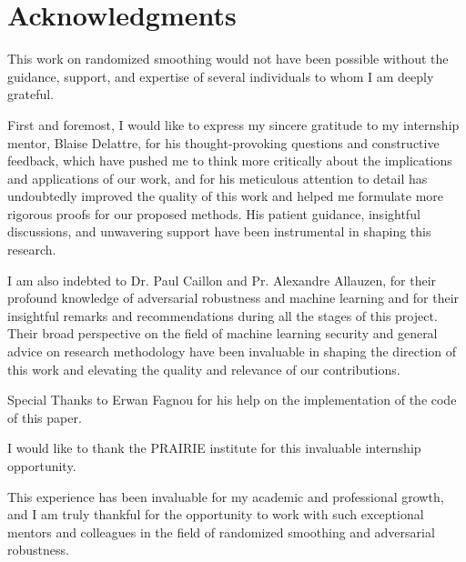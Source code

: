 \section*{Acknowledgments}
This work on randomized smoothing would not have been possible without the guidance, support, and expertise of several individuals to whom I am deeply grateful.

First and foremost, I would like to express my sincere gratitude to my internship mentor, Blaise Delattre, for his thought-provoking questions and constructive feedback, which have pushed me to think more critically about the implications and applications of our work, and for his meticulous attention to detail has undoubtedly improved the quality of this work and helped me formulate more rigorous proofs for our proposed methods.
His patient guidance, insightful discussions, and unwavering support have been instrumental in shaping this research.

I am also indebted to Dr. Paul Caillon and Pr. Alexandre Allauzen, for their profound knowledge of adversarial robustness and machine learning and for their insightful remarks and recommendations during all the stages of this project.
Their broad perspective on the field of machine learning security and general advice on research methodology have been invaluable in shaping the direction of this work and elevating the quality and relevance of our contributions.

Special Thanks to Erwan Fagnou for his help on the implementation of the code of this paper.

I would like to thank the PRAIRIE institute for this invaluable internship opportunity.

This experience has been invaluable for my academic and professional growth, and I am truly thankful for the opportunity to work with such exceptional mentors and colleagues in the field of randomized smoothing and adversarial robustness.
